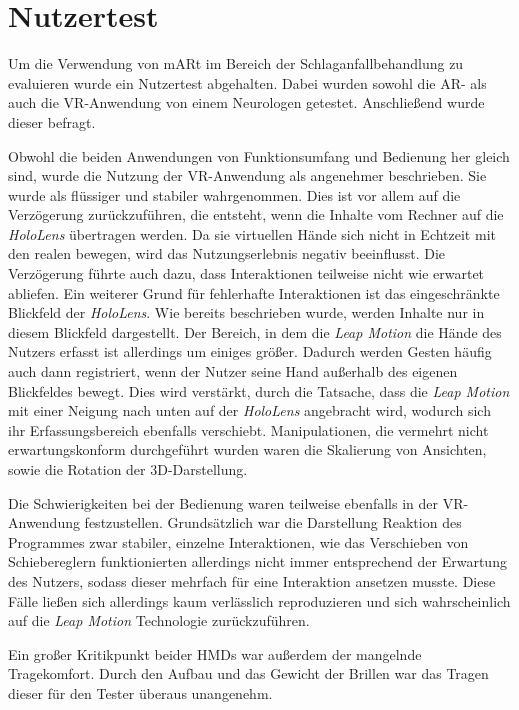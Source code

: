 \section{Nutzertest}
\label{nazuertest}

Um die Verwendung von mARt im Bereich der Schlaganfallbehandlung zu evaluieren wurde ein Nutzertest abgehalten. 
Dabei wurden sowohl die AR- als auch die VR-Anwendung von einem Neurologen getestet. Anschließend wurde dieser befragt.

Obwohl die beiden Anwendungen von Funktionsumfang und Bedienung her gleich sind, wurde die Nutzung der VR-Anwendung als angenehmer beschrieben. 
Sie wurde als flüssiger und stabiler wahrgenommen. 
Dies ist vor allem auf die Verzögerung zurückzuführen, die entsteht, wenn die Inhalte vom Rechner auf die \textit{HoloLens} übertragen werden. Da sie virtuellen Hände sich nicht in Echtzeit mit den realen bewegen, wird das Nutzungserlebnis negativ beeinflusst. 
Die Verzögerung führte auch dazu, dass Interaktionen teilweise nicht wie erwartet abliefen. 
Ein weiterer Grund für fehlerhafte Interaktionen ist das eingeschränkte Blickfeld der \textit{HoloLens}. Wie bereits beschrieben wurde, werden Inhalte nur in diesem Blickfeld dargestellt. Der Bereich, in dem die \textit{Leap Motion} die Hände des Nutzers erfasst ist allerdings um einiges größer. Dadurch werden Gesten häufig auch dann registriert, wenn der Nutzer seine Hand außerhalb des eigenen Blickfeldes bewegt. Dies wird verstärkt, durch die Tatsache, dass die \textit{Leap Motion} mit einer Neigung nach unten auf der \textit{HoloLens} angebracht wird, wodurch sich ihr Erfassungsbereich ebenfalls verschiebt.
Manipulationen, die vermehrt nicht erwartungskonform durchgeführt wurden waren die Skalierung von Ansichten, sowie die Rotation der 3D-Darstellung.

Die Schwierigkeiten bei der Bedienung waren teilweise ebenfalls in der VR-Anwendung festzustellen. Grundsätzlich war die Darstellung Reaktion des Programmes zwar stabiler, einzelne Interaktionen, wie das Verschieben von Schiebereglern funktionierten allerdings nicht immer entsprechend der Erwartung des Nutzers, sodass dieser mehrfach für eine Interaktion ansetzen musste. 
Diese Fälle ließen sich allerdings kaum verlässlich reproduzieren und sich wahrscheinlich auf die \textit{Leap Motion} Technologie zurückzuführen.

Ein großer Kritikpunkt beider HMDs war außerdem der mangelnde Tragekomfort. Durch den Aufbau und das Gewicht der Brillen war das Tragen dieser für den Tester überaus unangenehm. 

